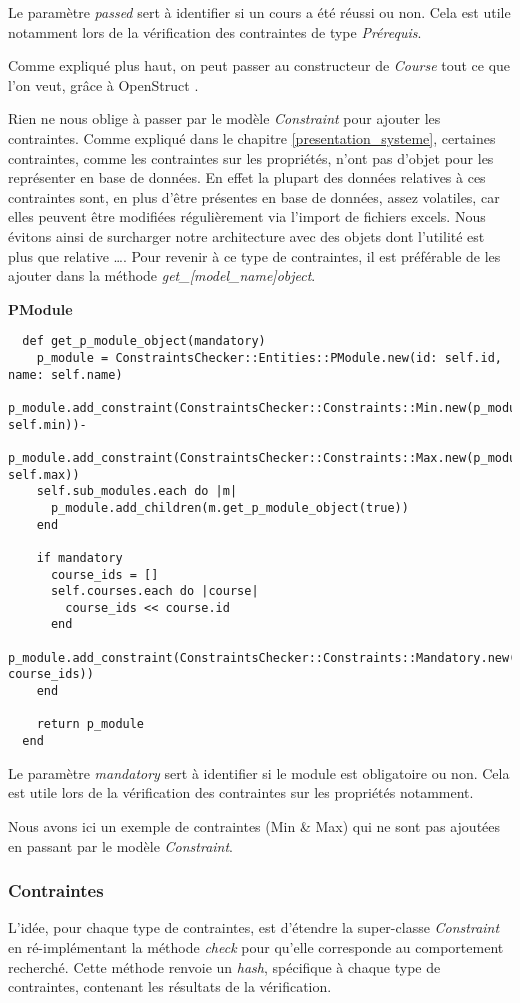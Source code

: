 Le paramètre \textit{passed} sert à identifier si un cours a été réussi ou non. Cela est utile notamment lors de la vérification des contraintes de type \textit{Prérequis}.

Comme expliqué plus haut, on peut passer au constructeur de \textit{Course} tout ce que l'on veut, grâce à OpenStruct \cite{OpenStruct}.

Rien ne nous oblige à passer par le modèle \textit{Constraint} pour ajouter les contraintes. Comme expliqué dans le chapitre \ref{presentation_systeme}, certaines contraintes, comme les contraintes sur les propriétés,  n'ont pas d'objet pour les représenter en base de données. En effet la plupart des données relatives à ces contraintes sont, en plus d'être présentes en base de données, assez volatiles, car elles peuvent être modifiées régulièrement via l'import de fichiers excels. Nous évitons ainsi de surcharger notre architecture avec des objets dont l'utilité est plus que relative \ldots. Pour revenir à ce type de contraintes, il est préférable de les ajouter dans la méthode \textit{get\_[model\_name]object}.

\textbf{PModule}

\begin{lstlisting}
  def get_p_module_object(mandatory)
    p_module = ConstraintsChecker::Entities::PModule.new(id: self.id, name: self.name)
    p_module.add_constraint(ConstraintsChecker::Constraints::Min.new(p_module, self.min))-
    p_module.add_constraint(ConstraintsChecker::Constraints::Max.new(p_module, self.max))
    self.sub_modules.each do |m|
      p_module.add_children(m.get_p_module_object(true))
    end

    if mandatory
      course_ids = []
      self.courses.each do |course|
        course_ids << course.id
      end
      p_module.add_constraint(ConstraintsChecker::Constraints::Mandatory.new(p_module, course_ids))
    end

    return p_module
  end
\end{lstlisting}

Le paramètre \textit{mandatory} sert à identifier si le module est obligatoire ou non. Cela est utile lors de la vérification des contraintes sur les propriétés notamment. 

Nous avons ici un exemple de contraintes (Min \& Max) qui ne sont pas ajoutées en passant par le modèle \textit{Constraint}. 


\subsubsection{Contraintes}
L'idée, pour chaque type de contraintes, est d'étendre la super-classe \textit{Constraint} en ré-implémentant la méthode \textit{check} pour qu'elle corresponde au comportement recherché. Cette méthode renvoie un \textit{hash}, spécifique à chaque type de contraintes, contenant les résultats de la vérification.

